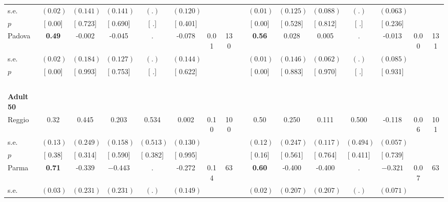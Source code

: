 \begin{longtable}{L{8em} c c c c c c c p{1em} c c c c c c c}
\quad \quad \quad \quad s.e.& $ (     0.02)$ & $ (    0.141)$ & $ (    0.141)$ & $ (        .)$ & $ (    0.120)$ & & & & $ (     0.01)$ & $ (    0.125)$ & $ (    0.088)$ & $ (        .)$ & $ (    0.063)$ & &  \\*
\quad \quad \quad \quad $ p$ & [     0.00] & [    0.723] & [    0.690] & [        .] & [    0.401] & & & & [     0.00] & [    0.528] & [    0.812] & [        .] & [    0.236] & &  \\[1em]
\quad \quad \quad Padova& \textbf{     0.49} &    -0.002 &    -0.045 &         . &    -0.078 &      0.01 &       130 & & \textbf{     0.56} &     0.028 &     0.005 &         . &    -0.013 &      0.00 &       131  \\*
\quad \quad \quad \quad s.e.& $ (     0.02)$ & $ (    0.184)$ & $ (    0.127)$ & $ (        .)$ & $ (    0.144)$ & & & & $ (     0.01)$ & $ (    0.146)$ & $ (    0.062)$ & $ (        .)$ & $ (    0.085)$ & &  \\*
\quad \quad \quad \quad $ p$ & [     0.00] & [    0.993] & [    0.753] & [        .] & [    0.622] & & & & [     0.00] & [    0.883] & [    0.970] & [        .] & [    0.931] & &  \\[1em]
~\\[1em]
\quad \quad \textbf{Adult 50} & & & & & & & & & & & & & & & \\* 
\quad \quad \quad Reggio& 0.32 &     0.445 &     0.203 &     0.534 &     0.002 &      0.10 &       100 & & 0.50 &     0.250 &     0.111 &     0.500 &    -0.118 &      0.06 &       101  \\*
\quad \quad \quad \quad s.e.& $ (     0.13)$ & $ (    0.249)$ & $ (    0.158)$ & $ (    0.513)$ & $ (    0.130)$ & & & & $ (     0.12)$ & $ (    0.247)$ & $ (    0.117)$ & $ (    0.494)$ & $ (    0.057)$ & &  \\*
\quad \quad \quad \quad $ p$ & [     0.38] & [    0.314] & [    0.590] & [    0.382] & [    0.995] & & & & [     0.16] & [    0.561] & [    0.764] & [    0.411] & [    0.739] & &  \\[1em]
\quad \quad \quad Parma& \textbf{     0.71} &    -0.339 & $ \mathbf{   -0.443}$ &         . &    -0.272 &      0.14 &        63 & & \textbf{     0.60} &    -0.400 &    -0.400 &         . & $ \mathbf{   -0.321}$ &      0.07 &        63  \\*
\quad \quad \quad \quad s.e.& $ (     0.03)$ & $ (    0.231)$ & $ (    0.231)$ & $ (        .)$ & $ (    0.149)$ & & & & $ (     0.02)$ & $ (    0.207)$ & $ (    0.207)$ & $ (        .)$ & $ (    0.071)$ & &  \\*

\end{longtable}
